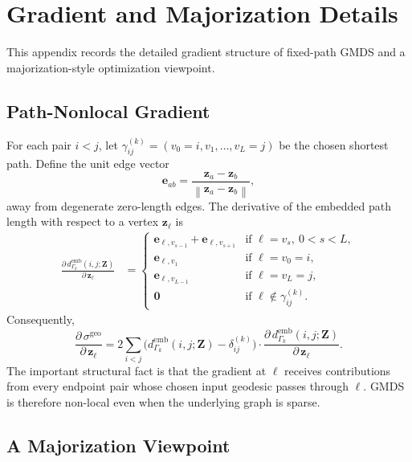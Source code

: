 \documentclass[11pt]{article}
\newcommand{\bz}{\mathbf{z}}
\newcommand{\bZ}{\mathbf{Z}}
\newcommand{\norm}[1]{\left\|#1\right\|}
\newcommand{\demb}{d^{\mathrm{emb}}}
\theoremstyle{definition}
\theoremstyle{plain}
\theoremstyle{remark}
\begin{document}
\section{Gradient and Majorization Details}
\label{app:gradient_majorization}

This appendix records the detailed gradient structure of fixed-path GMDS and a
majorization-style optimization viewpoint.

\subsection{Path-Nonlocal Gradient}

For each pair $i<j$, let
$\gamma_{ij}^{(k)}=(v_0=i,v_1,\ldots,v_L=j)$ be the chosen shortest path.
Define the unit edge vector
\begin{equation}
  \mathbf{e}_{ab} = \frac{\bz_a - \bz_b}{\norm{\bz_a - \bz_b}},
  \label{eq:unit_edge}
\end{equation}
away from degenerate zero-length edges.  The derivative of the embedded path
length with respect to a vertex $\bz_\ell$ is
\begin{align}
  \frac{\partial\, \demb_{\Gamma_k}(i,j;\bZ)}{\partial\, \bz_\ell}
  &= \begin{cases}
       \mathbf{e}_{\ell, v_{s-1}} + \mathbf{e}_{\ell, v_{s+1}}
         & \text{if } \ell = v_s,\ 0 < s < L, \\
       \mathbf{e}_{\ell, v_1}
         & \text{if } \ell = v_0 = i, \\
       \mathbf{e}_{\ell, v_{L-1}}
         & \text{if } \ell = v_L = j, \\
       \bm{0}
         & \text{if } \ell \notin \gamma_{ij}^{(k)}.
     \end{cases}
  \label{eq:geo_distance_gradient}
\end{align}
Consequently,
\begin{equation}
  \frac{\partial\, \sigma^{\mathrm{geo}}}{\partial\, \bz_\ell}
  = 2 \sum_{i < j}
    \bigl(\demb_{\Gamma_k}(i,j;\bZ) - \delta^{(k)}_{ij}\bigr)
    \cdot \frac{\partial\, \demb_{\Gamma_k}(i,j;\bZ)}{\partial\, \bz_\ell}.
  \label{eq:raw_gradient}
\end{equation}
The important structural fact is that the gradient at $\ell$ receives
contributions from every endpoint pair whose chosen input geodesic passes
through $\ell$.  GMDS is therefore non-local even when the underlying graph is
sparse.

\subsection{A Majorization Viewpoint}
\end{document}
